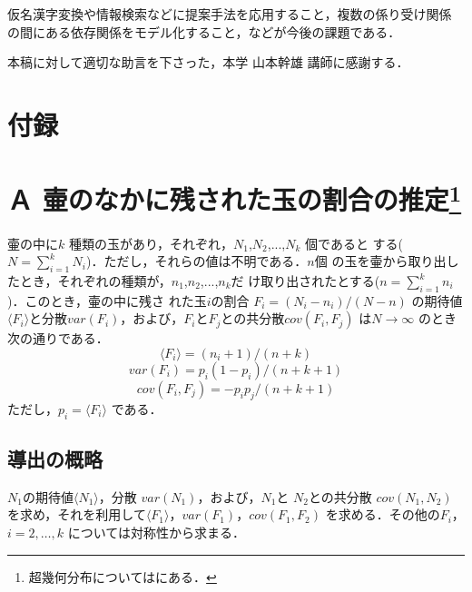 仮名漢字変換や情報検索などに提案手法を応用すること，複数の係り受け関係
の間にある依存関係をモデル化すること，などが今後の課題である．


\acknowledgment

本稿に対して適切な助言を下さった，本学 山本幹雄 講師に感謝する．

 



\section*{付録}
\label{sec:appendix}


\section*{Ａ 壷のなかに残された玉の割合の推定\footnote{超幾何分布については\cite[Chapter 6]{Jaynes96}にある．}}

\label{sec:apA}

壷の中に$k$ 種類の玉があり，それぞれ，$N_1$,$N_2$,...,$N_k$ 個であると
する($N = \sum_{i=1}^{k} N_i$)．ただし，それらの値は不明である．$n$個
の玉を壷から取り出したとき，それぞれの種類が，$n_1$,$n_2$,...,$n_k$だ
け取り出されたとする($n = \sum_{i=1}^{k} n_i$)．このとき，壷の中に残さ
れた玉$i$の割合 $F_i = (N_i - n_i)/(N - n)$ の期待値$\langle F_i
\rangle$と分散$var(F_i)$，および，$F_i$と$F_j$との共分散$cov(F_i,F_j)$
は$N \rightarrow \infty$ のとき次の通りである．
\begin{equation}
  \label{A1}
  \langle F_i \rangle = (n_i + 1)/(n + k)
\end{equation}
\begin{equation}
  \label{A2}
  var(F_i) = p_i (1 - p_i)/(n + k + 1)
\end{equation}
\begin{equation}
  \label{A3}
  cov(F_i,F_j) = - p_i p_j / (n + k + 1)
\end{equation}
ただし，$p_i = \langle F_i \rangle$ である．

\subsection*{導出の概略}

$N_1$の期待値$\langle N_1 \rangle$，分散 $var(N_1)$，および，$N_1$と
$N_2$との共分散 $cov(N_1,N_2)$ を求め，それを利用して$\langle F_1
\rangle$，$var(F_1)$，$cov(F_1,F_2)$ を求める．その他の$F_i$，$i =
2,\ldots,k$ については対称性から求まる．

